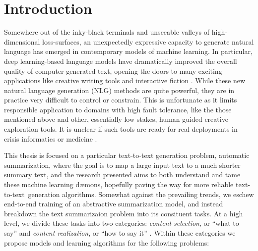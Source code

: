 \chapter{Introduction}



\addvspace{6\bigskipamount}

\startglyph Somewhere out of
the inky-black terminals and  unseeable valleys of high-dimensional
loss-surfaces, an unexpectedly expressive capacity to generate natural
language has emerged in contemporary models of machine learning.
In particular, deep learning-based language models have dramatically improved
the overall quality of computer generated text, opening the doors to many
exciting applications like creative writing tools
\citep{huggingface2019,samuel2019,seabrook2019} and interactive fiction
\citep{robertson2019}.  While these new natural language generation (NLG)
methods are quite powerful, they are in practice very difficult to control or
constrain. This is unfortunate as it limits responsible application to domains
with high fault tolerance, like the those mentioned above and other,
essentially low stakes, human guided creative exploration tools. It is unclear
if such tools are ready for real deployments in crisis informatics
\citep{starbird2013} or medicine \citep{gatt2009}.

This thesis is focused on a particular text-to-text generation problem,
automatic summarization, where the goal is to map a large input text to a much
shorter summary text, and the research presented aims to both understand and
tame these machine learning d{\ae}mons, hopefully paving the way for more
reliable text-to-text~generation algorithms.  Somewhat against the prevailing
trends, we eschew end-to-end training of an abstractive summarization model,
and instead breakdown the text summarizaion problem into its consituent tasks.
At a high level, we divide these tasks into two categories: \textit{content
selection}, or ``what to say'' and \textit{content realization}, or ``how to
say it'' \citep{mckeown1985}.  Within these categories we propose models and
learning algorithms for the following problems:
    
